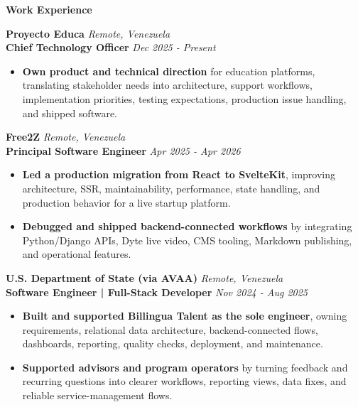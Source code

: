 \documentclass[10pt]{article}
\begin{document}
\vspace{3pt}
\begin{center}
    \textbf{Work Experience}
\end{center}
\vspace{-6pt}

\textbf{Proyecto Educa} \hfill \textit{Remote, Venezuela} \\
\textbf{Chief Technology Officer} \hfill \textit{Dec 2025 - Present}
\begin{itemize}
    \item \textbf{Own product and technical direction} for education platforms, translating stakeholder needs into architecture, support workflows, implementation priorities, testing expectations, production issue handling, and shipped software.
\end{itemize}

\vspace{2pt}
\textbf{Free2Z} \hfill \textit{Remote, Venezuela} \\
\textbf{Principal Software Engineer} \hfill \textit{Apr 2025 - Apr 2026}
\begin{itemize}
    \item \textbf{Led a production migration from React to SvelteKit}, improving architecture, SSR, maintainability, performance, state handling, and production behavior for a live startup platform.
    \item \textbf{Debugged and shipped backend-connected workflows} by integrating Python/Django APIs, Dyte live video, CMS tooling, Markdown publishing, and operational features.
\end{itemize}

\vspace{2pt}
\textbf{U.S. Department of State (via AVAA)} \hfill \textit{Remote, Venezuela} \\
\textbf{Software Engineer | Full-Stack Developer} \hfill \textit{Nov 2024 - Aug 2025}
\begin{itemize}
    \item \textbf{Built and supported Billingua Talent as the sole engineer}, owning requirements, relational data architecture, backend-connected flows, dashboards, reporting, quality checks, deployment, and maintenance.
    \item \textbf{Supported advisors and program operators} by turning feedback and recurring questions into clearer workflows, reporting views, data fixes, and reliable service-management flows.
\end{itemize}
\end{document}
